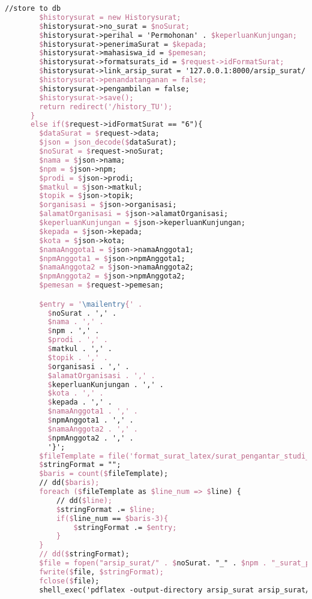 \begin{lstlisting}[language=tex,basicstyle=\tiny,caption=HistorysuratController.php]
        //store to db
        $historysurat = new Historysurat;
        $historysurat->no_surat = $noSurat;
        $historysurat->perihal = 'Permohonan' . $keperluanKunjungan;
        $historysurat->penerimaSurat = $kepada;
        $historysurat->mahasiswa_id = $pemesan;
        $historysurat->formatsurats_id = $request->idFormatSurat;
        $historysurat->link_arsip_surat = '127.0.0.1:8000/arsip_surat/' . $noSurat. '_' . $npm . '_surat_pengantar_studi_lapangan_2orang.pdf';
        $historysurat->penandatanganan = false;
        $historysurat->pengambilan = false;
        $historysurat->save();
        return redirect('/history_TU');
      }
      else if($request->idFormatSurat == "6"){
        $dataSurat = $request->data;
        $json = json_decode($dataSurat);
        $noSurat = $request->noSurat;
        $nama = $json->nama;
        $npm = $json->npm;
        $prodi = $json->prodi;
        $matkul = $json->matkul;
        $topik = $json->topik;
        $organisasi = $json->organisasi;
        $alamatOrganisasi = $json->alamatOrganisasi;
        $keperluanKunjungan = $json->keperluanKunjungan;
        $kepada = $json->kepada;
        $kota = $json->kota;
        $namaAnggota1 = $json->namaAnggota1;
        $npmAnggota1 = $json->npmAnggota1;
        $namaAnggota2 = $json->namaAnggota2;
        $npmAnggota2 = $json->npmAnggota2;
        $pemesan = $request->pemesan;

        $entry = '\mailentry{' .
          $noSurat . ',' .
          $nama . ',' .
          $npm . ',' .
          $prodi . ',' .
          $matkul . ',' .
          $topik . ',' .
          $organisasi . ',' .
          $alamatOrganisasi . ',' .
          $keperluanKunjungan . ',' .
          $kota . ',' .
          $kepada . ',' .
          $namaAnggota1 . ',' .
          $npmAnggota1 . ',' .
          $namaAnggota2 . ',' .
          $npmAnggota2 . ',' .
          '}';
        $fileTemplate = file('format_surat_latex/surat_pengantar_studi_lapangan_3orang.tex');
        $stringFormat = "";
        $baris = count($fileTemplate);
        // dd($baris);
        foreach ($fileTemplate as $line_num => $line) {
            // dd($line);
            $stringFormat .= $line;
            if($line_num == $baris-3){
                $stringFormat .= $entry;
            }
        }
        // dd($stringFormat);
        $file = fopen("arsip_surat/" . $noSurat. "_" . $npm . "_surat_pengantar_studi_lapangan_3orang.tex", "w");
        fwrite($file, $stringFormat);
        fclose($file);
        shell_exec('pdflatex -output-directory arsip_surat arsip_surat/' . $noSurat . '_' . $npm . '_surat_pengantar_studi_lapangan_3orang.tex');


\end{lstlisting}
